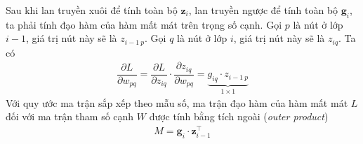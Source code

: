 Sau khi lan truyền xuôi để tính toàn bộ $\mathbf z_i$, lan truyền ngược để tính toàn bộ $\mathbf g_i$, ta phải tính đạo hàm của hàm mất mát trên trọng số cạnh. Gọi $p$ là nút ở lớp $i-1$, giá trị nút này sẽ là $z_{i-1\ p}$. Gọi $q$ là nút ở lớp $i$, giá trị nút này sẽ là $z_{iq}$. Ta có
\begin{align}
    \dfrac{\partial L}{\partial w_{pq}}=\dfrac{\partial L}{\partial z_{iq}}\cdot\dfrac{\partial z_{iq}}{\partial w_{pq}}=\underbrace{g_{iq}\cdot z_{i-1\ p}}_{1\times 1}
\end{align}
Với quy ước ma trận sắp xếp theo mẫu số, ma trận đạo hàm của hàm mất mát $L$ đối với ma trận tham số cạnh $W$ được tính bằng tích ngoài (\textit{outer product}) \cite{Aggarwal2023-zk}
\begin{align}
    M=\mathbf g_i\cdot\mathbf  z_{i-1}^\intercal
\end{align}
